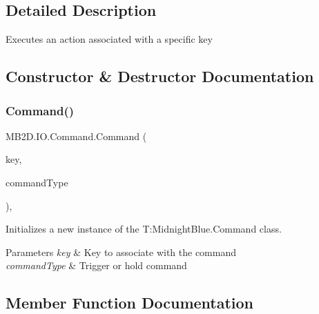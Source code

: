 \subsection{Detailed Description}
Executes an action associated with a specific key 



\subsection{Constructor \& Destructor Documentation}
\hypertarget{class_m_b2_d_1_1_i_o_1_1_command_a9cb2200e1b56437406cb300a782a425f}{}\label{class_m_b2_d_1_1_i_o_1_1_command_a9cb2200e1b56437406cb300a782a425f} 
\subsubsection{\texorpdfstring{Command()}{Command()}}
{\footnotesize\ttfamily M\+B2\+D.\+I\+O.\+Command.\+Command (\begin{DoxyParamCaption}\item[{Keys}]{key,  }\item[{\hyperlink{namespace_m_b2_d_1_1_i_o_ab5f95f3fe9e652778b62bdf943168a68}{Command\+Type}}]{command\+Type }\end{DoxyParamCaption})\hspace{0.3cm}{\ttfamily [inline]}, {\ttfamily [protected]}}



Initializes a new instance of the T\+:\+Midnight\+Blue.\+Command class. 


\begin{DoxyParams}{Parameters}
{\em key} & Key to associate with the command\\
\hline
{\em command\+Type} & Trigger or hold command\\
\hline
\end{DoxyParams}


\subsection{Member Function Documentation}
\hypertarget{class_m_b2_d_1_1_i_o_1_1_command_a59f97dd5810dd5b112c82ad3758da7e8}{}\label{class_m_b2_d_1_1_i_o_1_1_command_a59f97dd5810dd5b112c82ad3758da7e8} 
